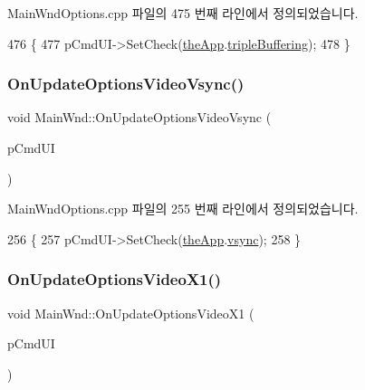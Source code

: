 Main\+Wnd\+Options.\+cpp 파일의 475 번째 라인에서 정의되었습니다.


\begin{DoxyCode}
476 \{
477     pCmdUI->SetCheck(\mbox{\hyperlink{_v_b_a_8cpp_a8095a9d06b37a7efe3723f3218ad8fb3}{theApp}}.\mbox{\hyperlink{class_v_b_a_af597e2c2466efdc6365a5d725651b855}{tripleBuffering}});
478 \}
\end{DoxyCode}
\mbox{\label{class_main_wnd_a62d2c4008242d583674336b144f82bbd}} 
\subsubsection{\texorpdfstring{On\+Update\+Options\+Video\+Vsync()}{OnUpdateOptionsVideoVsync()}}
{\footnotesize\ttfamily void Main\+Wnd\+::\+On\+Update\+Options\+Video\+Vsync (\begin{DoxyParamCaption}\item[{C\+Cmd\+UI $\ast$}]{p\+Cmd\+UI }\end{DoxyParamCaption})\hspace{0.3cm}{\ttfamily [protected]}}



Main\+Wnd\+Options.\+cpp 파일의 255 번째 라인에서 정의되었습니다.


\begin{DoxyCode}
256 \{
257   pCmdUI->SetCheck(\mbox{\hyperlink{_v_b_a_8cpp_a8095a9d06b37a7efe3723f3218ad8fb3}{theApp}}.\mbox{\hyperlink{class_v_b_a_a84075b77df64f3dc2100159064b79fba}{vsync}});
258 \}
\end{DoxyCode}
\mbox{\label{class_main_wnd_a74d2c1b8649f464fc5995638a22aabae}} 
\subsubsection{\texorpdfstring{On\+Update\+Options\+Video\+X1()}{OnUpdateOptionsVideoX1()}}
{\footnotesize\ttfamily void Main\+Wnd\+::\+On\+Update\+Options\+Video\+X1 (\begin{DoxyParamCaption}\item[{C\+Cmd\+UI $\ast$}]{p\+Cmd\+UI }\end{DoxyParamCaption})\hspace{0.3cm}{\ttfamily [protected]}}



